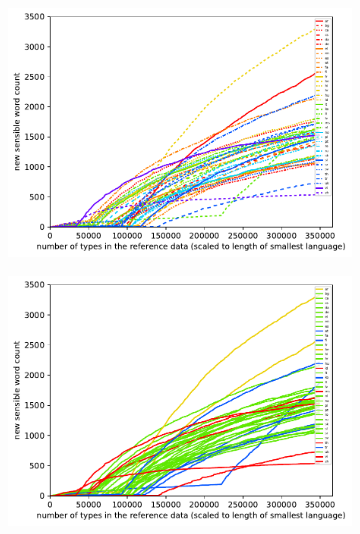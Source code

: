 \documentclass[11pt,a4paper,twoside,openright]{scrbook}
\begin{document}
\begin{figure}[h]
    \centering
    \begin{subfigure}[b]{0.32\textwidth}
    	\centering
        \includegraphics[width=\textwidth]{graphs/rnn/norm_huge_type_type_performance}
    \end{subfigure}
    \begin{subfigure}[b]{0.32\textwidth}
    	\centering
        \includegraphics[width=\textwidth]{graphs/rnn/morph_types/norm_huge_type_type_performance}
    \end{subfigure}
    \begin{subfigure}[b]{0.32\textwidth}
    	\centering

\end{subfigure}
\end{figure}
\end{document}
